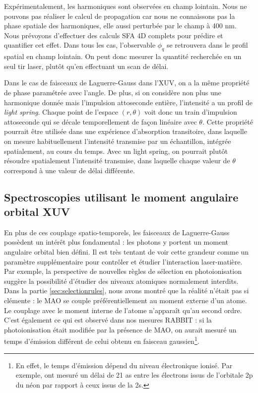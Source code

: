 Expérimentalement, les harmoniques sont observées en champ lointain. Nous ne pouvons pas réaliser le calcul de propagation car nous ne connaissons pas la phase spatiale des harmoniques, elle aussi perturbée par le champ à 400 nm. Nous prévoyons d'effectuer des calculs SFA 4D complets pour prédire et quantifier cet effet. Dans tous les cas, l'observable $\phi_q$ se retrouvera dans le profil spatial en champ lointain. On peut donc mesurer la quantité recherchée en un seul tir laser, plutôt qu'en effectuant un scan de délai.

Dans le cas de faisceaux de Laguerre-Gauss dans l'XUV, on a la même propriété de phase paramétrée avec l'angle. De plus, si on considère non plus une harmonique donnée mais l'impulsion attoseconde entière, l'intensité a un profil de \textit{light spring}. Chaque point de l'espace $(r,\theta)$ voit donc un train d'impulsion attoseconde qui se décale temporellement de façon linéaire avec $\theta$. Cette propriété pourrait être utilisée dans une expérience d'absorption transitoire, dans laquelle on mesure habituellement l'intensité transmise par un échantillon, intégrée spatialement, au cours du temps. Avec un light spring, on pourrait plutôt résoudre spatialement l'intensité transmise, dans laquelle chaque valeur de $\theta$ correspond à une valeur de délai différente.

\subsection{Spectroscopies utilisant le moment angulaire orbital XUV}
En plus de ces couplage spatio-temporels, les faisceaux de Laguerre-Gauss possèdent un intérêt plus fondamental : les photons y portent un moment angulaire orbital bien défini. Il est très tentant de voir cette grandeur comme un paramètre supplémentaire pour contrôler et étudier l'interaction laser-matière. Par exemple, la perspective de nouvelles règles de sélection en photoionisation suggère la possibilité d'étudier des niveaux atomiques normalement interdits. Dans la partie \ref{sec:selectionrules}, nous avons montré que la réalité n'était pas si clémente : le MAO se couple préférentiellement au moment externe d'un atome. Le couplage avec le moment interne de l'atome n'apparaît qu'au second ordre. C'est également ce qui est observé dans nos mesures RABBIT : si la photoionisation était modifiée par la présence de MAO, on aurait mesuré un temps d'émission différent de celui obtenu en faisceau gaussien\footnote{En effet, le temps d'émission dépend du niveau électronique ionisé. Par exemple,  ont mesuré un délai de 21 as entre les électrons issus de l'orbitale 2p du néon par rapport à ceux issus de la 2s.}.

